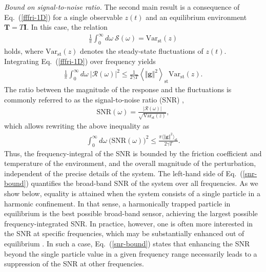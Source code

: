 \documentclass[aps,pre,twocolumn,superscriptaddress,notitlepage]{revtex4-2}
\newcommand{\av}[1]{\langle #1 \rangle}
\newcommand{\Av}[1]{\left\langle #1 \right\rangle}
\renewcommand{\eqref}[1]{Eq.~(\ref{#1})}
\begin{document}
\textit{Bound on signal-to-noise ratio.}
The second main result is a consequence of \eqref{fffri-1D} for a single observable $z(t)$ and an equilibrium environment $\bm{T} = T \bm{I}$.
In this case, the relation
\begin{align}
\frac{1}{\pi} \int_0^\infty d\omega \ \mathcal{S}(\omega) = \text{Var}_\text{st}(z)
\end{align}
holds, where $\text{Var}_\text{st}(z)$ denotes the steady-state fluctuations of $z(t)$.
Integrating \eqref{fffri-1D} over frequency yields
\begin{align}
\frac{1}{\pi} \int_0^\infty d\omega \ \big\vert \mathcal{R}(\omega) \big\vert^2 \leq \frac{1}{2 \gamma T} \Av{\Vert \bm{g} \Vert^2}_\text{st} \text{Var}_\text{st}(z) .
\end{align}
The ratio between the magnitude of the response and the fluctuations is commonly referred to as the signal-to-noise ratio (SNR) \cite{Fraden2010},
\begin{align}
\text{SNR}(\omega) = \frac{\big\vert \mathcal{R}(\omega) \big\vert}{\sqrt{\text{Var}_\text{st}(z)}} ,
\end{align}
which allows rewriting the above inequality as
\begin{align}
\int_0^\infty d\omega \ \big(\text{SNR}(\omega)\big)^2 \leq \frac{\pi \av{\Vert \bm{g} \Vert^2}_\text{st}}{2 \gamma T} \label{snr-bound} .
\end{align}
Thus, the frequency-integral of the SNR is bounded by the friction coefficient and temperature of the environment, and the overall magnitude of the perturbation, independent of the precise details of the system.
The left-hand side of \eqref{snr-bound} quantifies the broad-band SNR of the system over all frequencies.
As we show below, equality is attained when the system consists of a single particle in a harmonic confinement.
In that sense, a harmonically trapped particle in equilibrium is the best possible broad-band sensor, achieving the largest possible frequency-integrated SNR.
In practice, however, one is often more interested in the SNR at specific frequencies, which may be substantially enhanced out of equilibrium \cite{Dechant2024}.
In such a case, \eqref{snr-bound} states that enhancing the SNR beyond the single particle value in a given frequency range necessarily leads to a suppression of the SNR at other frequencies.
\end{document}
